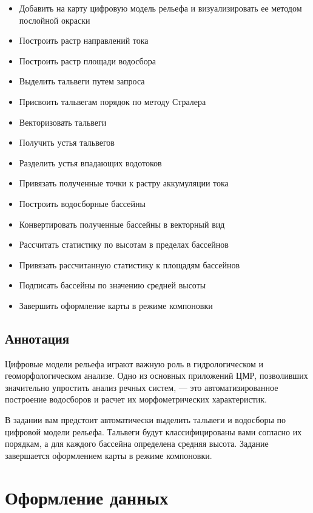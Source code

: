 \documentclass[12pt,]{book}
\providecommand{\tightlist}{%
  \setlength{\itemsep}{0pt}\setlength{\parskip}{0pt}}
\begin{document}
\begin{itemize}
\tightlist
\item
  Добавить на карту цифровую модель рельефа и визуализировать ее методом послойной окраски
\item
  Построить растр направлений тока
\item
  Построить растр площади водосбора
\item
  Выделить тальвеги путем запроса
\item
  Присвоить тальвегам порядок по методу Стралера
\item
  Векторизовать тальвеги
\item
  Получить устья тальвегов
\item
  Разделить устья впадающих водотоков
\item
  Привязать полученные точки к растру аккумуляции тока
\item
  Построить водосборные бассейны
\item
  Конвертировать полученные бассейны в векторный вид
\item
  Рассчитать статистику по высотам в пределах бассейнов
\item
  Привязать рассчитанную статистику к площадям бассейнов
\item
  Подписать бассейны по значению средней высоты
\item
  Завершить оформление карты в режиме компоновки
\end{itemize}

\hypertarget{dem-annotation}{%
\subsection{Аннотация}\label{dem-annotation}}

Цифровые модели рельефа играют важную роль в гидрологическом и геоморфологическом анализе. Одно из основных приложений ЦМР, позволивших значительно упростить анализ речных систем, --- это автоматизированное построение водосборов и расчет их морфометрических характеристик.

В задании вам предстоит автоматически выделить тальвеги и водосборы по цифровой модели рельефа. Тальвеги будут классифицированы вами согласно их порядкам, а для каждого бассейна определена средняя высота. Задание завершается оформлением карты в режиме компоновки.

\hypertarget{dem-design}{%
\section{Оформление данных}\label{dem-design}}
\end{document}

